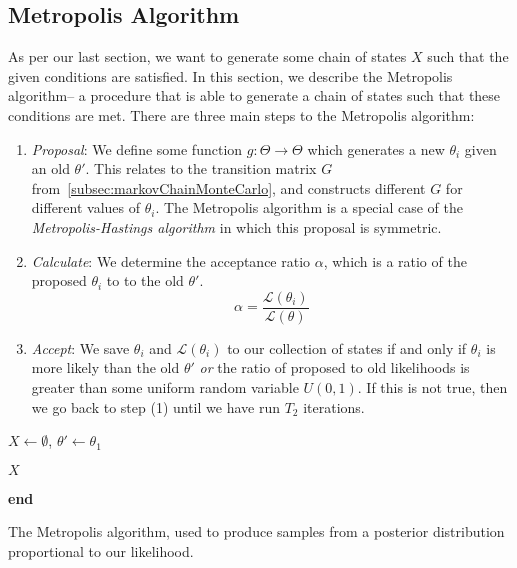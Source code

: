 \subsection{Metropolis Algorithm}\label{subsec:metropolisAlgorithm}
As per our last section, we want to generate some chain of states $X$ such that the given conditions are satisfied.
In this section, we describe the Metropolis algorithm-- a procedure that is able to generate a chain of states such that
these conditions are met.
There are three main steps to the Metropolis algorithm:
\begin{enumerate}
    \item \emph{Proposal}: We define some function $g : \Theta \rightarrow \Theta$ which generates a new $\theta_i$
        given an old $\theta'$.
        This relates to the transition matrix $G$ from~\autoref{subsec:markovChainMonteCarlo}, and constructs different
        $G$ for different values of $\theta_i$.
        The Metropolis algorithm is a special case of the \emph{Metropolis-Hastings algorithm} in which this proposal is
        symmetric.
    \item \emph{Calculate}: We determine the acceptance ratio $\alpha$, which is a ratio of the proposed $\theta_i$ to
        to the old $\theta'$.
    \begin{equation}
        \alpha = \frac{\mathcal{L}(\theta_i)}{\mathcal{L}(\theta)}
    \end{equation}
    \item \emph{Accept}: We save $\theta_i$ and $\mathcal{L}(\theta_i)$ to our collection of states if and only if
        $\theta_i$ is more likely than the old $\theta'$ \emph{or} the ratio of proposed to old likelihoods is greater
        than some uniform random variable $U(0, 1)$.
        If this is not true, then we go back to step (1) until we have run $T_2$ iterations.
\end{enumerate}

\begin{algorithm}[t]
    \SetAlgoLined
    \DontPrintSemicolon
     {
        $X \gets \emptyset$, $\theta' \gets \theta_1$ \;

        \Return $X$ \;
    }
    \textbf{end} \;
    \caption{The Metropolis algorithm, used to produce samples from a posterior distribution proportional to our
    likelihood.}
    \label{alg:metropolis}
\end{algorithm}

